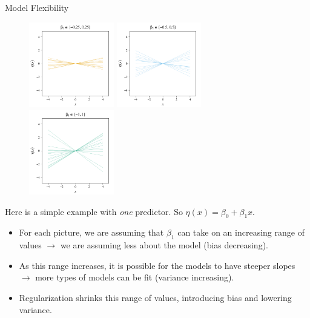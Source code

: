 \documentclass[8pt]{beamer}
\begin{document}
\begin{frame}{Model Flexibility}

\begin{figure}
    \centering
    \includegraphics[width = 0.33\textwidth]{b1.pdf}
    \includegraphics[width = 0.33\textwidth]{b2.pdf}
    \includegraphics[width = 0.33\textwidth]{b3.pdf}
\end{figure}

Here is a simple example with \textit{one} predictor. So $\eta(x) = \beta_0 + \beta_1 x$.
\begin{itemize}
    \item For each picture, we are assuming that $\beta_1$ can take on an increasing range of values $\to$ we are assuming less about the model (bias decreasing).
    \item As this range increases, it is possible for the models to have steeper slopes $\to$ more types of models can be fit (variance increasing).
    \item Regularization shrinks this range of values, introducing bias and lowering variance.
\end{itemize}
    
\end{frame}
\end{document}
